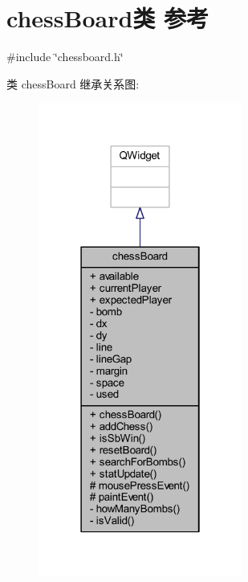 \hypertarget{classchess_board}{}\section{chess\+Board类 参考}
\label{classchess_board}


{\ttfamily \#include \char`\"{}chessboard.\+h\char`\"{}}



类 chess\+Board 继承关系图\+:
\nopagebreak
\begin{figure}[H]
\begin{center}
\leavevmode
\includegraphics[width=190pt]{de/d0a/classchess_board__inherit__graph}
\end{center}
\end{figure}


